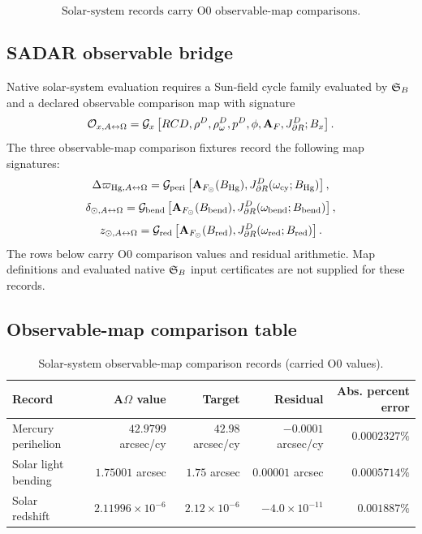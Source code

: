 \[
\boxed{\text{Solar-system records carry O0 observable-map comparisons.}}
\]

\subsection{SADAR observable bridge}\label{manual:solar:observable-export-bridge}
Native solar-system evaluation requires a Sun-field cycle family evaluated by \(\mathfrak S_B\) and a declared observable comparison map with signature
\[
\mathcal O_{x,A{\leftrightarrow}\Omega}
=
\mathcal G_x
\left[
RCD,\rho^D,\rho^D_\omega,p^D,\phi,\mathbf A_F,J^D_{\partial R};B_x
\right].
\]
The three observable-map comparison fixtures record the following map signatures:
\[
\Delta\varpi_{\mathrm{Hg},A{\leftrightarrow}\Omega}
=
\mathcal G_{\mathrm{peri}}
\left[
\mathbf A_{F_\odot}(B_{\mathrm{Hg}}),
J^D_{\partial R}(\omega_{\mathrm{cy}};B_{\mathrm{Hg}})
\right],
\]
\[
\delta_{\odot,A{\leftrightarrow}\Omega}
=
\mathcal G_{\mathrm{bend}}
\left[
\mathbf A_{F_\odot}(B_{\mathrm{bend}}),
J^D_{\partial R}(\omega_{\mathrm{bend}};B_{\mathrm{bend}})
\right],
\]
\[
z_{\odot,A{\leftrightarrow}\Omega}
=
\mathcal G_{\mathrm{red}}
\left[
\mathbf A_{F_\odot}(B_{\mathrm{red}}),
J^D_{\partial R}(\omega_{\mathrm{red}};B_{\mathrm{red}})
\right].
\]
The rows below carry O0 comparison values and residual arithmetic. Map definitions and evaluated native \(\mathfrak S_B\) input certificates are not supplied for these records.

\subsection{Observable-map comparison table}\label{manual:solar:observable-map-table}

\begin{table}[h]
\centering
\scriptsize
\caption{Solar-system observable-map comparison records (carried O0 values).}
\begin{tabularx}{\textwidth}{l r r r r}
\toprule
Record & A\(\Omega\) value & Target & Residual & Abs. percent error\\
\midrule
Mercury perihelion & $42.9799$ arcsec/cy & $42.98$ arcsec/cy & $-0.0001$ arcsec/cy & $0.0002327\%$\\
Solar light bending & $1.75001$ arcsec & $1.75$ arcsec & $0.00001$ arcsec & $0.0005714\%$\\
Solar redshift & $2.11996\times10^{-6}$ & $2.12\times10^{-6}$ & $-4.0\times10^{-11}$ & $0.001887\%$\\
\bottomrule
\end{tabularx}
\label{tab:manual-solar-observable-map-results}
\end{table}

